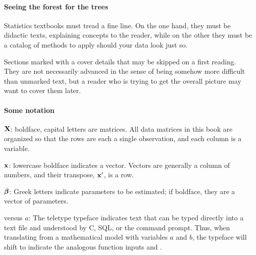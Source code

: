 
\paragraph{\treesymbol Seeing the forest for the trees} Statistics textbooks
must tread a fine line. On the one hand, they must be didactic texts,
explaining concepts to the reader, while on the other they must be a
catalog of methods to apply should your data look just so.

Sections marked with a \ind{\treesymbol} cover details that may be
skipped on a first reading. They are not necessarily advanced
in the sense of being somehow more difficult than unmarked text, but a
reader who is trying to get the overall picture may want to cover them 
later. 

\paragraph{Some notation}  \hfill

${\bf X}$: boldface, capital letters are matrices. All data matrices in this
book are organized so that the rows are each a single observation, and
each column is a variable.

${\bf x}$: lowercase boldface indicates a vector. Vectors are generally a
column of numbers, and their transpose, ${\bf x}'$, is a row.

${\mbox{\boldmath$\beta$}}$: Greek letters indicate parameters to be estimated;
if boldface, they are a vector of parameters.

 versus $a$: The teletype typeface indicates text
that can be typed directly into a text file and understood by C, SQL, or
the command prompt. Thus, when translating from a mathematical model
with variables $a$ and $b$, the typeface will shift to indicate the
analogous function inputs  and .



